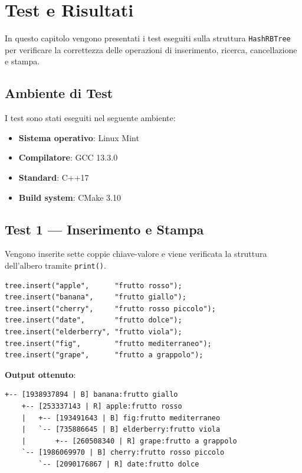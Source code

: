 \chapter{Test e Risultati}

In questo capitolo vengono presentati i test eseguiti sulla struttura 
\texttt{HashRBTree} per verificare la correttezza delle operazioni di 
inserimento, ricerca, cancellazione e stampa.

\section{Ambiente di Test}

I test sono stati eseguiti nel seguente ambiente:

\begin{itemize}
    \item \textbf{Sistema operativo}: Linux Mint
    \item \textbf{Compilatore}: GCC 13.3.0
    \item \textbf{Standard}: C++17
    \item \textbf{Build system}: CMake 3.10
\end{itemize}

\section{Test 1 --- Inserimento e Stampa}

Vengono inserite sette coppie chiave-valore e viene verificata la struttura 
dell'albero tramite \texttt{print()}.

\begin{lstlisting}
tree.insert("apple",      "frutto rosso");
tree.insert("banana",     "frutto giallo");
tree.insert("cherry",     "frutto rosso piccolo");
tree.insert("date",       "frutto dolce");
tree.insert("elderberry", "frutto viola");
tree.insert("fig",        "frutto mediterraneo");
tree.insert("grape",      "frutto a grappolo");
\end{lstlisting}

\textbf{Output ottenuto}:

\begin{lstlisting}
+-- [1938937894 | B] banana:frutto giallo
    +-- [253337143 | R] apple:frutto rosso
    |   +-- [193491643 | B] fig:frutto mediterraneo
    |   `-- [735886645 | B] elderberry:frutto viola
    |       +-- [260508340 | R] grape:frutto a grappolo
    `-- [1986069970 | B] cherry:frutto rosso piccolo
        `-- [2090176867 | R] date:frutto dolce
\end{lstlisting}

